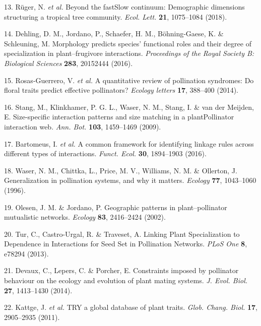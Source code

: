 \documentclass[12pt,a4paper,]{article}
\begin{document}
\hypertarget{ref-ruger2018}{}
13. Rüger, N. \emph{et al.} Beyond the fastSlow continuum: Demographic
dimensions structuring a tropical tree community. \emph{Ecol. Lett.}
\textbf{21}, 1075--1084 (2018).

\hypertarget{ref-dehling2016}{}
14. Dehling, D. M., Jordano, P., Schaefer, H. M., Böhning-Gaese, K. \&
Schleuning, M. Morphology predicts species' functional roles and their
degree of specialization in plant--frugivore interactions.
\emph{Proceedings of the Royal Society B: Biological Sciences}
\textbf{283}, 20152444 (2016).

\hypertarget{ref-rosas2014}{}
15. Rosas-Guerrero, V. \emph{et al.} A quantitative review of
pollination syndromes: Do floral traits predict effective pollinators?
\emph{Ecology letters} \textbf{17}, 388--400 (2014).

\hypertarget{ref-stang2009}{}
16. Stang, M., Klinkhamer, P. G. L., Waser, N. M., Stang, I. \& van der
Meijden, E. Size-specific interaction patterns and size matching in a
plantPollinator interaction web. \emph{Ann. Bot.} \textbf{103},
1459--1469 (2009).

\hypertarget{ref-bartomeus2016}{}
17. Bartomeus, I. \emph{et al.} A common framework for identifying
linkage rules across different types of interactions. \emph{Funct.
Ecol.} \textbf{30}, 1894--1903 (2016).

\hypertarget{ref-waser1996}{}
18. Waser, N. M., Chittka, L., Price, M. V., Williams, N. M. \&
Ollerton, J. Generalization in pollination systems, and why it matters.
\emph{Ecology} \textbf{77}, 1043--1060 (1996).

\hypertarget{ref-olesen2002}{}
19. Olesen, J. M. \& Jordano, P. Geographic patterns in
plant--pollinator mutualistic networks. \emph{Ecology} \textbf{83},
2416--2424 (2002).

\hypertarget{ref-tur2013}{}
20. Tur, C., Castro-Urgal, R. \& Traveset, A. Linking Plant
Specialization to Dependence in Interactions for Seed Set in Pollination
Networks. \emph{PLoS One} \textbf{8}, e78294 (2013).

\hypertarget{ref-devaux2014}{}
21. Devaux, C., Lepers, C. \& Porcher, E. Constraints imposed by
pollinator behaviour on the ecology and evolution of plant mating
systems. \emph{J. Evol. Biol.} \textbf{27}, 1413--1430 (2014).

\hypertarget{ref-kattge2011}{}
22. Kattge, J. \emph{et al.} TRY a global database of plant traits.
\emph{Glob. Chang. Biol.} \textbf{17}, 2905--2935 (2011).
\end{document}
